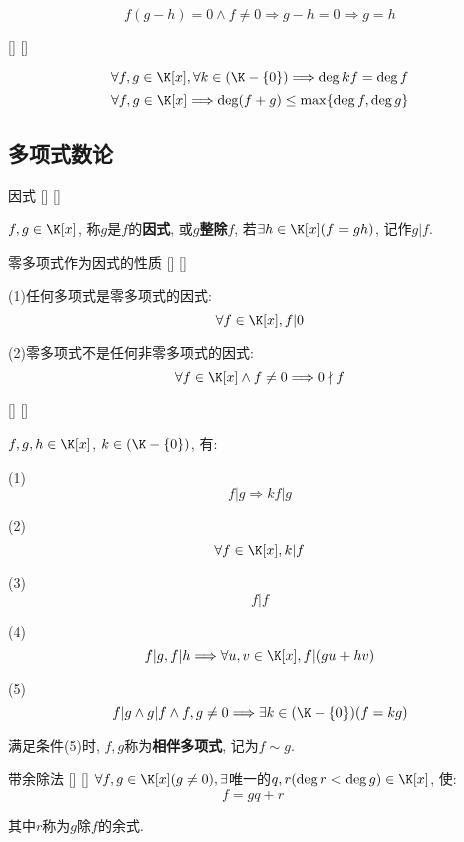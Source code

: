 \documentclass[UTF8]{ctexart}
\begin{document}
        \begin{prf}
			\[f(g-h)=0\wedge f\neq 0\Longrightarrow g-h=0\Longrightarrow g=h\]
        \end{prf}
        
		\begin{ppt}
			[]
			{}
			[]
			[]
			
			\[\forall f,g\in\K[x], \forall k\in(\K-\{0\})\Longrightarrow\deg kf=\deg f\]
			\[\forall f,g\in\K[x]\Longrightarrow\deg (f+g)\leq\max\{\deg f,\deg g\}\]
		\end{ppt}
		
	\subsection{多项式数论}

		\begin{dfn}
			[]
			{因式}
			[]
			[]
			
			$f,g\in\K[x]$, 称$g$是$f$的\textbf{因式}, 或$g$\textbf{整除}$f$, 若$\exists h\in\K[x](f=gh)$, 记作$g|f$. 
		\end{dfn}
		
		\begin{ppt}
			[]
			{零多项式作为因式的性质}
			[]
			[]
			
			(1)任何多项式是零多项式的因式: 
			\[\forall f\in\K[x], f|0\]

			(2)零多项式不是任何非零多项式的因式: 
			\[\forall f\in\K[x]\wedge f\neq 0\Longrightarrow 0\nmid f\]
		\end{ppt}

		\begin{ppt}
			[]
			{}
			[]
			[]
			
			$f,g,h\in\K[x]$, $k\in(\K-\{0\})$, 有: 
			
			(1)\[f|g\Longrightarrow kf|g\]

			(2)\[\forall f\in\K[x], k|f\]

			(3)\[f|f\]

			(4)\[f|g,f|h\Longrightarrow\forall u,v\in\K[x], f|(gu+hv)\]

			(5)\[f|g\wedge g|f\wedge f,g\neq 0\Longrightarrow\exists k\in(\K-\{0\})(f=kg)\]

			满足条件(5)时, $f,g$称为\textbf{相伴多项式}, 记为$f\sim g$. 
		\end{ppt}

		\begin{thm}
			[]
			{带余除法}
			[]
			[]
			$\forall f,g\in\K[x](g\neq 0), \exists$唯一的$q,r(\deg r<\deg g)\in\K[x]$, 使: 
			\[f=gq+r\quad\]

			其中$r$称为$g$除$f$的余式. 
		\end{thm}
  
\end{document}
